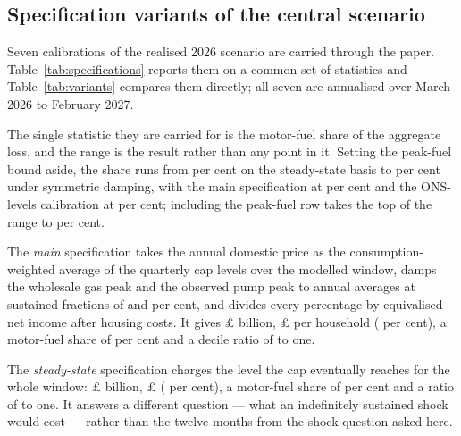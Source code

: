 \subsection{Specification variants of the central scenario}
\label{app:specvariants}

Seven calibrations of the realised 2026 scenario are carried through the paper. Table~\ref{tab:specifications} reports them on a common set of statistics and Table~\ref{tab:variants} compares them directly; all seven are annualised over March 2026 to February 2027.

The single statistic they are carried for is the motor-fuel share of the aggregate loss, and the range is the result rather than any point in it. Setting the peak-fuel bound aside, the share runs from \genSpecFuelShareMinPct{} per cent on the steady-state basis to \genSymDampMotorFuelShareOfLoss{} per cent under symmetric damping, with the main specification at \genMotorFuelShareOfLoss{} per cent and the ONS-levels calibration at \genOnsLevelsMotorFuelShareOfLoss{} per cent; including the peak-fuel row takes the top of the range to \genSpecFuelShareMaxPct{} per cent.

\begin{table}[htbp]
\centering
\caption{The seven calibrations of the realised 2026 scenario, on a common set of statistics. The main specification applies the equivalised after-housing-costs denominator and the consumption-weighted quarterly cap average; each of the others varies one accounting or imputation choice from it.}
\label{tab:specifications}

\end{table}

The \emph{main} specification takes the annual domestic price as the consumption-weighted average of the quarterly cap levels over the modelled window, damps the wholesale gas peak and the observed pump peak to annual averages at sustained fractions of \genGasSustainedFraction{} and \genPumpSustainedFraction{} per cent, and divides every percentage by equivalised net income after housing costs. It gives \pounds \genAggSpendRealisedBn{} billion, \pounds \genCentralLossMean{} per household (\genCentralLossPctIncome{} per cent), a motor-fuel share of \genMotorFuelShareOfLoss{} per cent and a decile ratio of \genDecileRatioPct{} to one.

The \emph{steady-state} specification charges the level the cap eventually reaches for the whole window: \pounds \genSteadyStateAggBn{} billion, \pounds \genSteadyStateLossMean{} (\genSteadyStateLossPctIncome{} per cent), a motor-fuel share of \genSteadyStateMotorFuelShareOfLoss{} per cent and a ratio of \genSteadyStateDecileRatioPct{} to one. It answers a different question --- what an indefinitely sustained shock would cost --- rather than the twelve-months-from-the-shock question asked here.

